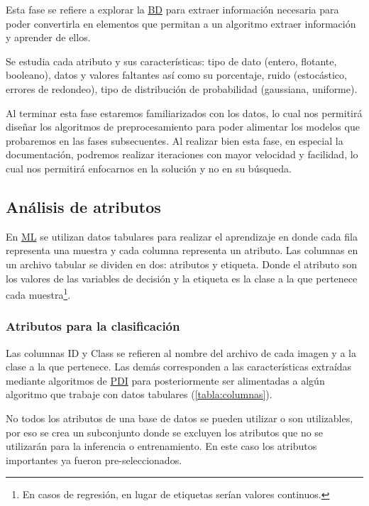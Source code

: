 Esta fase se refiere a explorar la \hyperlink{abbr}{BD} para extraer información
necesaria para poder convertirla en elementos que permitan a un algoritmo
extraer información y aprender de ellos.

Se estudia cada atributo y sus características: tipo de dato (entero, flotante,
booleano), datos y valores faltantes así como su porcentaje, ruido (estocástico,
errores de redondeo), tipo de distribución de probabilidad (gaussiana, uniforme).

Al terminar esta fase estaremos familiarizados con los datos, lo cual nos
permitirá diseñar los algoritmos de preprocesamiento para poder alimentar los
modelos que probaremos en las fases subsecuentes. Al realizar bien esta fase, en
especial la documentación, podremos realizar iteraciones con mayor velocidad y
facilidad, lo cual nos permitirá enfocarnos en la solución y no en su búsqueda.

\subsection{Análisis de atributos}

En \hyperlink{abbr}{ML} se utilizan datos tabulares para realizar el aprendizaje
en donde cada fila representa una muestra y cada columna representa un atributo.
Las columnas en un archivo tabular se dividen en dos: atributos y etiqueta.
Donde el atributo son los valores de las variables de decisión y la etiqueta es
la clase a la que pertenece cada muestra\footnote{En casos de regresión, en
lugar de etiquetas serían valores continuos.}.

\subsubsection{Atributos para la clasificación}

Las columnas ID y Class se refieren al nombre del archivo de cada imagen y a la
clase a la que pertenece. Las demás corresponden a las características extraídas
mediante algoritmos de \hyperlink{abbr}{PDI} para posteriormente ser alimentadas
a algún algoritmo que trabaje con datos tabulares (\autoref{tabla:columnas}).

No todos los atributos de una base de datos se pueden utilizar o son
utilizables, por eso se crea un subconjunto donde se excluyen los atributos que
no se utilizarán para la inferencia o entrenamiento. En este caso los atributos
importantes ya fueron pre-seleccionados.

